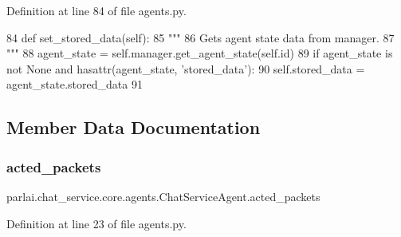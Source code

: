 Definition at line 84 of file agents.\+py.


\begin{DoxyCode}
84     \textcolor{keyword}{def }set\_stored\_data(self):
85         \textcolor{stringliteral}{"""}
86 \textcolor{stringliteral}{        Gets agent state data from manager.}
87 \textcolor{stringliteral}{        """}
88         agent\_state = self.manager.get\_agent\_state(self.id)
89         \textcolor{keywordflow}{if} agent\_state \textcolor{keywordflow}{is} \textcolor{keywordflow}{not} \textcolor{keywordtype}{None} \textcolor{keywordflow}{and} hasattr(agent\_state, \textcolor{stringliteral}{'stored\_data'}):
90             self.stored\_data = agent\_state.stored\_data
91 
\end{DoxyCode}


\subsection{Member Data Documentation}
\mbox{\label{classparlai_1_1chat__service_1_1core_1_1agents_1_1ChatServiceAgent_ac394b3601eb7039d5fb43c38795bbf49}} 
\subsubsection{\texorpdfstring{acted\+\_\+packets}{acted\_packets}}
{\footnotesize\ttfamily parlai.\+chat\+\_\+service.\+core.\+agents.\+Chat\+Service\+Agent.\+acted\+\_\+packets}



Definition at line 23 of file agents.\+py.

\mbox{\label{classparlai_1_1chat__service_1_1core_1_1agents_1_1ChatServiceAgent_a6e02c9025ec3cf0ba64c58896ff97cc6}} 
